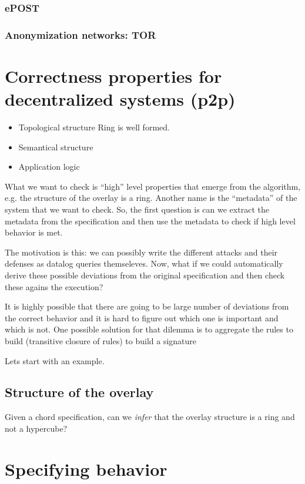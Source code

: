  
 
 
\subsubsection{ePOST} 
 
\subsubsection{Anonymization networks: TOR} 
 
 
\section{Correctness properties for decentralized systems (p2p)} 
 
\begin{itemize} 
\item{Topological structure} Ring is well formed.  
\item{Semantical structure}  
\item{Application logic}  
\end{itemize} 
 
What we want to check is ``high'' level properties that emerge from the algorithm, e.g. the structure of the overlay is a ring. Another name is the ``metadata'' of the system that we want to check. So, the first question is can we extract the metadata from the specification and then use the metadata to check if high level behavior is met. 
 
 
The motivation is this: we can possibly write the different attacks and their defenses as datalog queries themseleves. Now, what if we could automatically derive these possible deviations from the original specification and then check these agains the execution?  
 
 
It is highly possible that there are going to be large number of deviations from the correct behavior and it is hard to figure out which one is important and which is not. One possible solution for that dilemma is to aggregate the rules to build (transitive closure of rules) to build a signature 
 
Lets start with an example. 
\subsection{Structure of the overlay} 
Given a chord specification, can we \textit{infer} that the overlay structure is a ring and not a hypercube? 
 
 
\section{Specifying behavior} 
 
